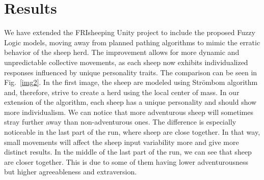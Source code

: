 \documentclass[9pt]{pnas-new}
\begin{document}

\section*{Results}
We have extended the FRIsheeping Unity project to include the proposed Fuzzy Logic models, moving away from planned pathing algorithms to mimic the erratic behavior of the sheep herd. The improvement allows for more dynamic and unpredictable collective movements, as each sheep now exhibits individualized responses influenced by unique personality traits. The comparison can be seen in Fig.~\ref{img2}. In the first image, the sheep are modeled using Str\"{o}mbom algorithm and, therefore, strive to create a herd using the local center of mass. In our extension of the algorithm, each sheep has a unique personality and should show more individualism. We can notice that more adventurous sheep will sometimes stray further away than non-adventurous ones. The difference is especially noticeable in the last part of the run, where sheep are close together. In that way, small movements will affect the sheep input variability more and give more distinct results. In the middle of the last part of the run, we can see that sheep are closer together. This is due to some of them having lower adventurousness but higher agreeableness and extraversion.
\end{document}
